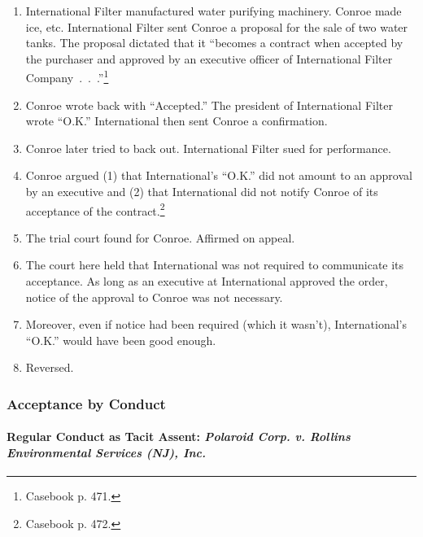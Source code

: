 \begin{enumerate}
    \item International Filter manufactured water purifying machinery. Conroe 
    made ice, etc. International Filter sent Conroe a proposal for the sale of 
    two water tanks. The proposal dictated that it ``becomes a contract when 
    accepted by the purchaser and approved by an executive officer of 
    International Filter Company~.~.~.''\footnote{Casebook p. 471.}
    \item Conroe wrote back with ``Accepted.'' The president of International 
    Filter wrote ``O.K.'' International then sent Conroe a confirmation.
    \item Conroe later tried to back out. International Filter sued for 
    performance.
    \item Conroe argued (1) that International's ``O.K.'' did not amount to an 
    approval by an executive and (2) that International did not notify Conroe 
    of its acceptance of the contract.\footnote{Casebook p. 472.}
    \item The trial court found for Conroe. Affirmed on appeal.
    \item The court here held that International was not required to 
    communicate its acceptance. As long as an executive at International 
    approved the order, notice of the approval to Conroe was not necessary.
    \item Moreover, even if notice had been required (which it wasn't), 
    International's ``O.K.'' would have been good enough.
    \item Reversed.
\end{enumerate}

\subsubsection{Acceptance by Conduct}

\paragraph{Regular Conduct as Tacit Assent: \emph{Polaroid Corp. v. Rollins 
Environmental Services (NJ), Inc.}}

